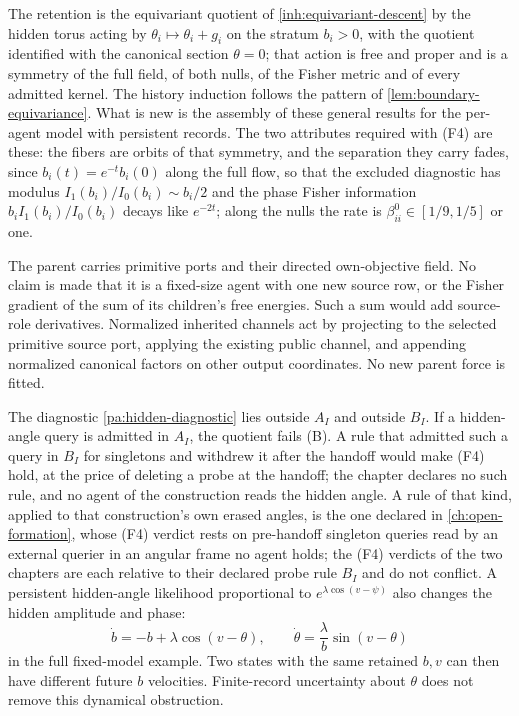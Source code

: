 The retention is the equivariant quotient of \cref{inh:equivariant-descent} by the hidden torus acting by $\theta_i\mapsto\theta_i+g_i$ on the stratum $b_i>0$, with the quotient identified with the canonical section $\theta=0$; that action is free and proper and is a symmetry of the full field, of both nulls, of the Fisher metric and of every admitted kernel. The history induction follows the pattern of \cref{lem:boundary-equivariance}. What is new is the assembly of these general results for the per-agent model with persistent records. The two attributes required with (F4) are these: the fibers are orbits of that symmetry, and the separation they carry fades, since $b_i(t)=e^{-t}b_i(0)$ along the full flow, so that the excluded diagnostic has modulus $I_1(b_i)/I_0(b_i)\sim b_i/2$ and the phase Fisher information $b_iI_1(b_i)/I_0(b_i)$ decays like $e^{-2t}$; along the nulls the rate is $\beta^0_{ii}\in[1/9,1/5]$ or one.

The parent carries primitive ports and their directed own-objective field. No claim is made that it is a fixed-size agent with one new source row, or the Fisher gradient of the sum of its children's free energies. Such a sum would add source-role derivatives. Normalized inherited channels act by projecting to the selected primitive source port, applying the existing public channel, and appending normalized canonical factors on other output coordinates. No new parent force is fitted.

The diagnostic \cref{pa:hidden-diagnostic} lies outside $A_I$ and outside $B_I$. If a hidden-angle query is admitted in $A_I$, the quotient fails (B). A rule that admitted such a query in $B_I$ for singletons and withdrew it after the handoff would make (F4) hold, at the price of deleting a probe at the handoff; the chapter declares no such rule, and no agent of the construction reads the hidden angle. A rule of that kind, applied to that construction's own erased angles, is the one declared in \cref{ch:open-formation}, whose (F4) verdict rests on pre-handoff singleton queries read by an external querier in an angular frame no agent holds; the (F4) verdicts of the two chapters are each relative to their declared probe rule $B_I$ and do not conflict. A persistent hidden-angle likelihood proportional to $e^{\lambda\cos(v-\psi)}$ also changes the hidden amplitude and phase:
\begin{equation}
 \dot b=-b+\lambda\cos(v-\theta),\qquad
 \dot\theta=\frac{\lambda}{b}\sin(v-\theta)
 \label{pa:hidden-record-obstruction}
\end{equation}
in the full fixed-model example. Two states with the same retained $b,v$ can then have different future $b$ velocities. Finite-record uncertainty about $\theta$ does not remove this dynamical obstruction.

